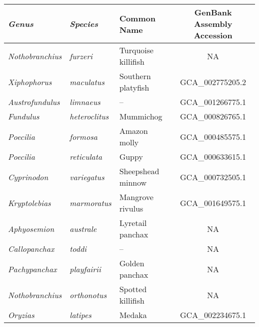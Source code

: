 \begin{tabular}{>{\itshape}l>{\itshape}llc}\toprule
\textnormal{\textbf{Genus}} & \textnormal{\textbf{Species}} & \textbf{Common Name} & \textbf{GenBank Assembly Accession}\\\midrule
Nothobranchius & furzeri & Turquoise killifish & NA\tnote{1}\\\midrule
Xiphophorus & maculatus & Southern platyfish & GCA\_002775205.2\\
Austrofundulus & limnaeus & -- & GCA\_001266775.1\\
Fundulus & heteroclitus & Mummichog & GCA\_000826765.1\\
Poecilia & formosa & Amazon molly & GCA\_000485575.1\\
Poecilia & reticulata & Guppy & GCA\_000633615.1\\
Cyprinodon & variegatus & Sheepshead minnow & GCA\_000732505.1\\
Kryptolebias & marmoratus & Mangrove rivulus & GCA\_001649575.1\\\midrule
Aphyosemion & australe & Lyretail panchax & NA\tnote{2}\\
Callopanchax & toddi & -- & NA\tnote{2}\\
Pachypanchax & playfairii & Golden panchax & NA\tnote{2}\\
Nothobranchius & orthonotus & Spotted killifish & NA\tnote{2}\\\midrule
Oryzias & latipes & Medaka & GCA\_002234675.1\\
\bottomrule\end{tabular}